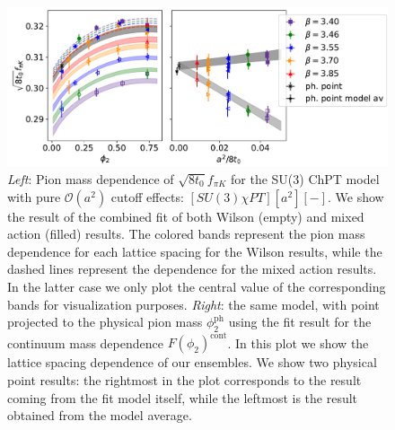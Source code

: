 \begin{figure}
    \centering
    \includegraphics[width=1.\textwidth]{./cap5/figs/SU3_comb.pdf}
    \caption{\textit{Left}: Pion mass dependence of $\sqrt{8t_0}f_{\pi K}$ for the SU(3) ChPT model with pure $\mathcal{O}(a^2)$ cutoff effects: $[SU(3)\chi PT][a^2][-]$. We show the result of the combined fit of both Wilson (empty) and mixed action (filled) results. The colored bands represent the pion mass dependence for each lattice spacing for the Wilson results, while the dashed lines represent the dependence for the mixed action results. In the latter case we only plot the central value of the corresponding bands for visualization purposes. \textit{Right}: the same model, with point projected to the physical pion mass $\phi_2^{\textrm{ph}}$ using the fit result for the continuum mass dependence $F(\phi_2)^{\textrm{cont}}$. In this plot we show the lattice spacing dependence of our ensembles. We show two physical point results: the rightmost in the plot corresponds to the result coming from the fit model itself, while the leftmost is the result obtained from the model average.}
    \label{ch_ss:fig:SU3a2}
\end{figure}

